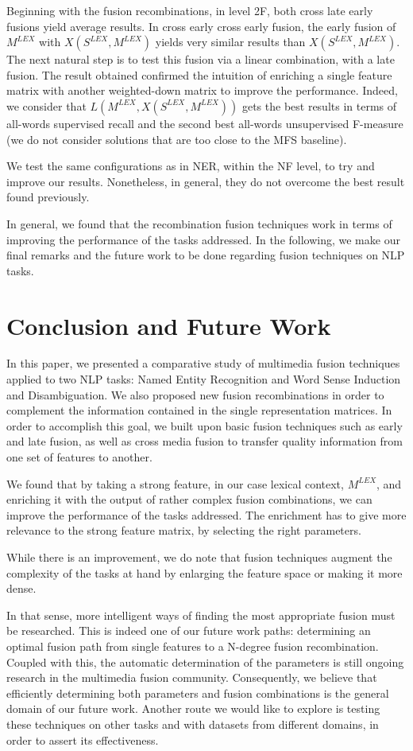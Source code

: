 \documentclass{llncs}
\newcommand\mlex{M^{\scriptscriptstyle LEX}}
\newcommand\slex{S^{\scriptscriptstyle LEX}}
\begin{document}
Beginning with the fusion recombinations, in level 2F, both cross late early fusions yield average results. In cross early cross early fusion, the early fusion of $\mlex$ with  $X(\slex, \mlex)$ yields very similar results than $X(\slex, \mlex)$. The next natural step is to test this fusion via a linear combination, with a late fusion. The result obtained confirmed the intuition of enriching a single feature matrix with another weighted-down matrix to improve the performance. Indeed, we consider that $L(M^{LEX}, X(S^{LEX}, M^{LEX}))$ gets the best results in terms of all-words supervised recall and the second best all-words unsupervised F-measure (we do not consider solutions that are too close to the MFS baseline). 

We test the same configurations as in NER, within the NF level, to try and improve our results. Nonetheless, in general, they do not overcome the best result found previously.

In general, we found that the recombination fusion techniques work in terms of improving the performance of the tasks addressed. In the following, we make our final remarks and the future work to be done regarding fusion techniques on NLP tasks.

\section{Conclusion and Future Work}
In this paper, we presented a comparative study of multimedia fusion techniques applied to two NLP tasks: Named Entity Recognition and Word Sense Induction and Disambiguation. We also proposed new fusion recombinations in order to complement the information contained in the single representation matrices. In order to accomplish this goal, we built upon basic fusion techniques such as early and late fusion, as well as cross media fusion to transfer quality information from one set of features to another. 

We found that by taking a strong feature, in our case lexical context, $\mlex$, and enriching it with the output of rather complex fusion combinations, we can improve the performance of the tasks addressed. The enrichment has to give more relevance to the strong feature matrix, by selecting the right parameters. 

While there is an improvement, we do note that fusion techniques augment the complexity of the tasks at hand by enlarging the feature space or making it more dense.

In that sense, more intelligent ways of finding the most appropriate fusion must be researched. This is indeed one of our future work paths: determining an optimal fusion path from single features to a N-degree fusion recombination. Coupled with this, the automatic determination of the parameters is still ongoing research in the multimedia fusion community. Consequently, we believe that efficiently determining both parameters and fusion combinations is the general domain of our future work. Another route we would like to explore is testing these techniques on other tasks and with datasets from different domains, in order to assert its effectiveness.



\end{document}
